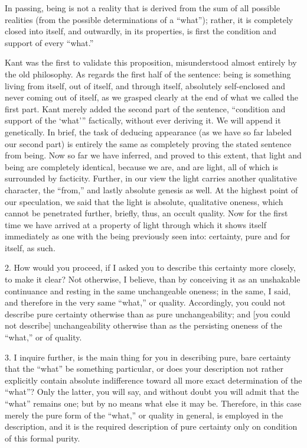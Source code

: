 In passing, being is not a reality that is
derived from the sum of all possible realities
(from the possible determinations of a “what”);
rather, it is completely closed into itself,
and outwardly, in its properties, is
first the condition and support of every “what.”

Kant was the first to validate this proposition,
misunderstood almost entirely by the old philosophy.
As regards the first half of the sentence:
being is something living
from itself, out of itself, and through itself,
absolutely self-enclosed and never coming out of itself,
as we grasped clearly at the end of what we called the first part.
Kant merely added the second part of the sentence,
“condition and support of the ‘what'”
factically, without ever deriving it.
We will append it genetically.
In brief, the task of deducing appearance
(as we have so far labeled our second part)
is entirely the same as completely proving the
stated sentence from being.
Now so far we have inferred,
and proved to this extent,
that light and being are completely identical,
because we are, and are light,
all of which is surrounded by facticity.
Further, in our view the light carries
another qualitative character, the “from,”
and lastly absolute genesis as well.
At the highest point of our speculation,
we said that the light is absolute, qualitative oneness,
which cannot be penetrated further,
briefly, thus, an occult quality.
Now for the first time we have arrived
at a property of light through which it shows itself
immediately as one with the being previously seen into:
certainty, pure and for itself, as such.

2. How would you proceed, if I asked you
to describe this certainty more closely, to make it clear?
Not otherwise, I believe, than by conceiving it
as an unshakable continuance and resting
in the same unchangeable oneness;
in the same, I said, and therefore
in the very same “what,” or quality.
Accordingly, you could not describe pure certainty otherwise
than as pure unchangeability;
and [you could not describe] unchangeability otherwise
than as the persisting oneness of the “what,” or of quality.

3. I inquire further, is the main thing for you
in describing pure, bare certainty
that the “what” be something particular,
or does your description not rather explicitly contain
absolute indifference toward all more exact determination of the “what”?
Only the latter, you will say, and without doubt
you will admit that the “what” remains one;
but by no means what else it may be.
Therefore, in this case merely the pure form of the “what,”
or quality in general, is employed in the description,
and it is the required description of pure certainty
only on condition of this formal purity.


